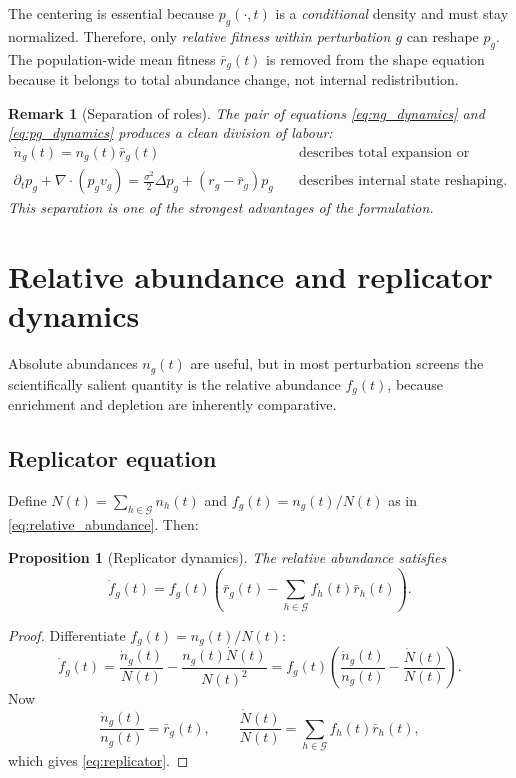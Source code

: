 \documentclass[11pt]{article}
\newcommand{\G}{\mathcal{G}}
\newcommand{\1}{\mathbf{1}}
\theoremstyle{plain}
\newtheorem{proposition}{Proposition}
\newtheorem{remark}{Remark}
\begin{document}
The centering is essential because $p_g(\cdot,t)$ is a \emph{conditional} density and must stay normalized. Therefore, only \emph{relative fitness within perturbation $g$} can reshape $p_g$. The population-wide mean fitness $\bar r_g(t)$ is removed from the shape equation because it belongs to total abundance change, not internal redistribution.

\begin{remark}[Separation of roles]
The pair of equations \eqref{eq:ng_dynamics} and \eqref{eq:pg_dynamics} produces a clean division of labour:
\begin{align*}
\dot n_g(t)=n_g(t)\bar r_g(t)
&\quad\text{describes total expansion or depletion,}\\
\partial_t p_g + \nabla\cdot(p_gv_g)=\frac{\sigma^2}{2}\Delta p_g +(r_g-\bar r_g)p_g
&\quad\text{describes internal state reshaping.}
\end{align*}
This separation is one of the strongest advantages of the formulation.
\end{remark}

\section{Relative abundance and replicator dynamics}

Absolute abundances $n_g(t)$ are useful, but in most perturbation screens the scientifically salient quantity is the relative abundance $f_g(t)$, because enrichment and depletion are inherently comparative.

\subsection{Replicator equation}

Define $N(t)=\sum_{h\in\G} n_h(t)$ and $f_g(t)=n_g(t)/N(t)$ as in \eqref{eq:relative_abundance}. Then:

\begin{proposition}[Replicator dynamics]
The relative abundance satisfies
\begin{equation}
\dot f_g(t)
=
f_g(t)\left(\bar r_g(t)-\sum_{h\in\G}f_h(t)\bar r_h(t)\right).
\label{eq:replicator}
\end{equation}
\end{proposition}

\begin{proof}
Differentiate $f_g(t)=n_g(t)/N(t)$:
\[
\dot f_g(t)=\frac{\dot n_g(t)}{N(t)}-\frac{n_g(t)\dot N(t)}{N(t)^2}
=f_g(t)\left(\frac{\dot n_g(t)}{n_g(t)}-\frac{\dot N(t)}{N(t)}\right).
\]
Now
\[
\frac{\dot n_g(t)}{n_g(t)}=\bar r_g(t),
\qquad
\frac{\dot N(t)}{N(t)}=\sum_{h\in\G} f_h(t)\bar r_h(t),
\]
which gives \eqref{eq:replicator}.
\end{proof}
\end{document}
